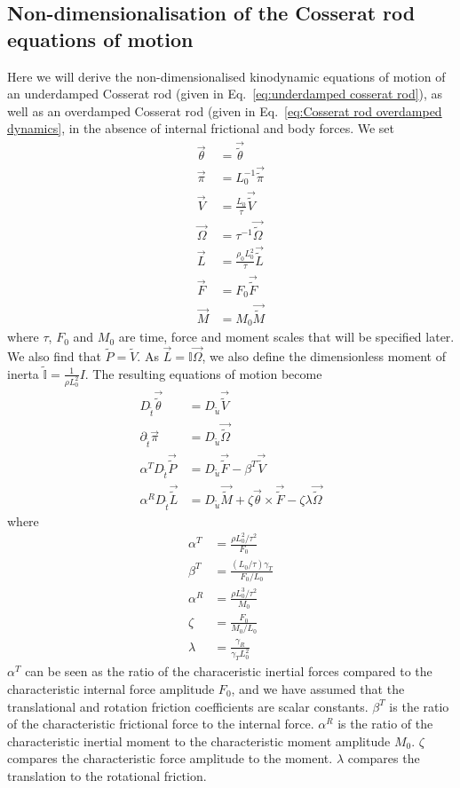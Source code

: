 \documentclass[withindex,glossary,techreport]{cam-thesis}
\begin{document}
\begin{appendices}
\chapter{Non-dimensionalisation of the Cosserat rod equations of motion} \label{app:Nondimensionalisation of the Cosserat rod}

Here we will derive the non-dimensionalised kinodynamic equations of motion of an underdamped Cosserat rod (given in Eq.~\ref{eq:underdamped cosserat rod}), as well as an overdamped Cosserat rod (given in Eq.~\ref{eq:Cosserat rod overdamped dynamics}, in the absence of internal frictional and body forces. We set
\begin{align*}
\vec{\theta} & =\vec{\tilde{\theta}}\\
\vec{\pi} & =L_{0}^{-1}\vec{\tilde{\pi}}\\
\vec{V} & =\frac{L_{0}}{\tau}\vec{\tilde{V}}\\
\vec{\Omega} & =\tau^{-1}\vec{\tilde{\Omega}}\\
\vec{L} & =\frac{\rho_0 L_{0}^{2}}{\tau}\vec{\tilde{L}}\\
\vec{F} & =F_{0}\vec{\tilde{F}}\\
\vec{M} & =M_{0}\vec{\tilde{M}}
\end{align*}
where $\tau$, $F_{0}$ and $M_{0}$ are time, force and moment scales
that will be specified later. We also find that $\tilde{P} = \tilde{V}$. As $\vec{L}= \mathbb{I} \vec{\Omega}$, we also
define the dimensionless moment of inerta $\tilde{\mathbb{I}}=\frac{1}{\rho L_{0}^{2}}I$.
The resulting equations of motion become
\begin{align}
D_{\tilde{t}}\vec{\tilde{\theta}} & =D_{\tilde{u}}\vec{\tilde{V}}\\
\partial_{\tilde{t}}\vec{\pi} & =D_{\tilde{u}}\vec{\tilde{\Omega}}\\
\alpha^{T}D_{\tilde{t}}\vec{\tilde{P}} & =D_{\tilde{u}}\vec{\tilde{F}}-\beta^{T}\vec{\tilde{V}}\\
\alpha^{R}D_{\tilde{t}}\vec{\tilde{L}} & =D_{\tilde{u}}\vec{\tilde{M}}+\zeta\vec{\theta}\times\vec{\tilde{F}}-\zeta\lambda\vec{\tilde{\Omega}}
\end{align}
where
\begin{align*}
\alpha^{T} & =\frac{\rho L_{0}^{2}/\tau^{2}}{F_{0}}\\
\beta^{T} & =\frac{(L_{0}/\tau)\gamma_{T}}{F_{0}/L_{0}}\\
\alpha^{R} & =\frac{\rho L_{0}^{3}/\tau^{2}}{M_{0}}\\
\zeta & =\frac{F_{0}}{M_{0}/L_{0}}\\
\lambda & =\frac{\gamma_{R}}{\gamma_{T}L_{0}^{2}}
\end{align*}
$\alpha^{T}$ can be seen as the ratio of the characeristic inertial
forces compared to the characteristic internal force amplitude $F_{0}$, and we have assumed that the translational and rotation friction coefficients are scalar constants. $\beta^{T}$ is the ratio of the characteristic frictional force to
the internal force. $\alpha^{R}$ is the ratio of the characteristic
inertial moment to the characteristic moment amplitude $M_{0}$. $\zeta$
compares the characteristic force amplitude to the moment. $\lambda$
compares the translation to the rotational friction.


\end{appendices}
\end{document}
